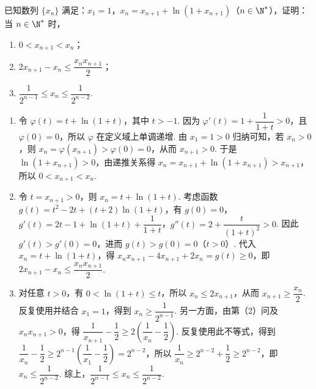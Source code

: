 \begin{problem}
已知数列 \(\{x_n\}\) 满足：\(x_1=1\)，\(x_n=x_{n+1}+\ln(1+x_{n+1})\)（\(n\in \N^*\)），证明：当 \(n\in \N^*\) 时，

\begin{enumerate}
\item \(0<x_{n+1}<x_n\)；
\item \(2x_{n+1}-x_n\le \dfrac{x_nx_{n+1}}{2}\)；
\item \(\dfrac{1}{2^{n-1}}\le x_n\le \dfrac{1}{2^{n-2}}\).
\end{enumerate}
\end{problem}

\begin{solution}
\begin{enumerate}
\item 令 \(\varphi(t)=t+\ln(1+t)\)，其中 \(t>-1\). 因为 \(\varphi'(t)=1+\dfrac{1}{1+t}>0\)，且 \(\varphi(0)=0\)，所以 \(\varphi\) 在定义域上单调递增. 由 \(x_1=1>0\) 归纳可知，若 \(x_n>0\)，则 \(x_n=\varphi(x_{n+1})>\varphi(0)=0\)，从而 \(x_{n+1}>0\). 于是 \(\ln(1+x_{n+1})>0\)，由递推关系得 \(x_n=x_{n+1}+\ln(1+x_{n+1})>x_{n+1}\)，所以 \(0<x_{n+1}<x_n\).
\item 令 \(t=x_{n+1}>0\)，则 \(x_n=t+\ln(1+t)\). 考虑函数 \(g(t)=t^2-2t+(t+2)\ln(1+t)\)，有 \(g(0)=0\)，\(g'(t)=2t-1+\ln(1+t)+\dfrac{1}{1+t}\)，\(g''(t)=2+\dfrac{t}{(1+t)^2}>0\). 因此 \(g'(t)>g'(0)=0\)，进而 \(g(t)>g(0)=0\)（\(t>0\)）. 代入 \(x_n=t+\ln(1+t)\)，得 \(x_nx_{n+1}-4x_{n+1}+2x_n=g(t)\geq0\)，即 \(2x_{n+1}-x_n\leq\dfrac{x_nx_{n+1}}{2}\).
\item 对任意 \(t>0\)，有 \(0<\ln(1+t)\leq t\)，所以 \(x_n\leq2x_{n+1}\)，从而 \(x_{n+1}\geq\dfrac{x_n}{2}\). 反复使用并结合 \(x_1=1\)，得到 \(x_n\geq\dfrac{1}{2^{n-1}}\). 另一方面，由第（2）问及 \(x_nx_{n+1}>0\)，得 \(\dfrac{1}{x_{n+1}}-\dfrac{1}{2}\geq2\left(\dfrac{1}{x_n}-\dfrac{1}{2}\right)\). 反复使用此不等式，得到 \(\dfrac{1}{x_n}-\dfrac{1}{2}\geq2^{n-1}\left(\dfrac{1}{x_1}-\dfrac{1}{2}\right)=2^{n-2}\)，所以 \(\dfrac{1}{x_n}\geq2^{n-2}+\dfrac{1}{2}\geq2^{n-2}\)，即 \(x_n\leq\dfrac{1}{2^{n-2}}\). 综上，\(\dfrac{1}{2^{n-1}}\leq x_n\leq\dfrac{1}{2^{n-2}}\).
\end{enumerate}
\end{solution}
